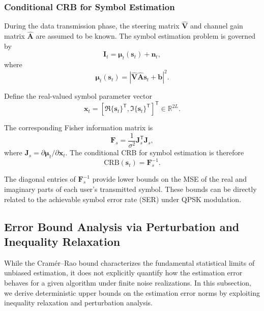 \documentclass[journal]{IEEEtran}
\begin{document}
\subsubsection{Conditional CRB for Symbol Estimation}

During the data transmission phase, the steering matrix $\hat{\mathbf{V}}$ and
channel gain matrix $\hat{\mathbf{A}}$ are assumed to be known.
The symbol estimation problem is governed by
\begin{equation}
\mathbf{I}_t
=
\boldsymbol{\mu}_t(\mathbf{s}_t)
+
\mathbf{n}_t,
\end{equation}
where
\begin{equation}
\boldsymbol{\mu}_t(\mathbf{s}_t)
=
\left|
\hat{\mathbf{V}}
\hat{\mathbf{A}}
\mathbf{s}_t
+
\mathbf{b}
\right|^2.
\end{equation}

Define the real-valued symbol parameter vector
\begin{equation}
\mathbf{x}_t
=
\left[
\Re\{\mathbf{s}_t\}^{\mathsf{T}},
\Im\{\mathbf{s}_t\}^{\mathsf{T}}
\right]^{\mathsf{T}}
\in \mathbb{R}^{2L}.
\end{equation}

The corresponding Fisher information matrix is
\begin{equation}
\mathbf{F}_s
=
\frac{1}{\sigma^2}
\mathbf{J}_s^{\mathsf{T}}
\mathbf{J}_s,
\end{equation}
where
$\mathbf{J}_s = \partial \boldsymbol{\mu}_t / \partial \mathbf{x}_t$.
The conditional CRB for symbol estimation is therefore
\begin{equation}
\mathrm{CRB}(\mathbf{s}_t)
=
\mathbf{F}_s^{-1}.
\label{eq:crb_symbol}
\end{equation}

The diagonal entries of $\mathbf{F}_s^{-1}$ provide lower bounds on the MSE of
the real and imaginary parts of each user's transmitted symbol.
These bounds can be directly related to the achievable symbol error rate (SER)
under QPSK modulation.

\subsection{Error Bound Analysis via Perturbation and Inequality Relaxation}

While the Cram\'er--Rao bound characterizes the fundamental statistical limits
of unbiased estimation, it does not explicitly quantify how the estimation
error behaves for a given algorithm under finite noise realizations.
In this subsection, we derive deterministic upper bounds on the estimation
error norms by exploiting inequality relaxation and perturbation analysis.
\end{document}
